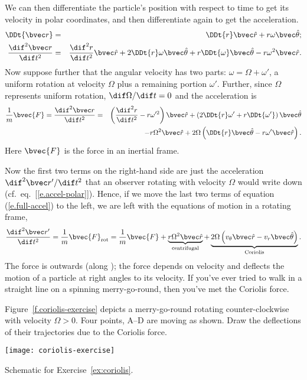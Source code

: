 We can then differentiate the particle's position with respect to time to get its velocity in polar coordinates, and then differentiate again to get the acceleration.
\begin{eqnarray}
\DDt{\rv} &=& \DDt{r}\rhat + r\omega\thetahat; \\
\DDtt{\rv} &=& \DDtt{r}\rhat + 2\DDt{r}\omega\thetahat + r \DDt{\omega}\thetahat - r\omega^{2}\rhat.
\label{e.accel-polar}
\end{eqnarray}
Now suppose further that the angular velocity has two parts: $\omega = \Omega+\omega'$, a uniform rotation at velocity $\Omega$ plus a remaining portion $\omega'$.  Further, since $\Omega$ represents uniform rotation, $\dif\Omega/\dif t = 0$ and the acceleration is
\begin{eqnarray}
\frac{1}{m}\bvec{F} = \DDtt{\rv} &=& \left(\DDtt{r} - r\omega'^{2}\right)\rhat + \left(2\DDt{r}\omega' + r\DDt{\omega'}\right)\thetahat\nonumber\\
 && -r\Omega^{2}\rhat + 2\Omega\left(\DDt{r}\thetahat - r\omega'\rhat\right).
\label{e.full-accel}
\end{eqnarray}
Here $\bvec{F}$ is the force in an inertial frame.

Now the first two terms on the right-hand side are just the acceleration $\dif^{2}\rv'/\dif t^{2}$ that an observer rotating with velocity $\Omega$ would write down (cf.\ eq.~[\ref{e.accel-polar}]).  Hence, if we move the last two terms of equation (\ref{e.full-accel}) to the left, we are left with the equations of motion in a rotating frame,
\begin{equation}\label{e.motion-rotating}
\DDtt{\rv'} = \frac{1}{m}\bvec{F}_{\mathrm{rot}} = \frac{1}{m}\bvec{F} 
	+  \underbrace{r\Omega^{2}\rhat}_{\textrm{centrifugal}}
	+	\underbrace{2\Omega\left(v_{\theta}\rhat - v_{r}\thetahat \right)}_{\textrm{Coriolis}}.
\end{equation}
The  force is outwards (along \rhat); the  force depends on velocity and deflects the motion of a particle at right angles to its velocity.  If you've ever tried to walk in a straight line on a spinning merry-go-round, then you've met the Coriolis force.

\begin{exercisebox}
\label{ex:coriolis}
Figure~\ref{f.coriolis-exercise} depicts a merry-go-round rotating counter-clockwise with velocity $\Omega > 0$.  Four points, A--D are moving as shown.  Draw the deflections of their trajectories due to the Coriolis force.
\end{exercisebox}
\begin{marginfigure}[4\baselineskip]
\texttt{[image: coriolis-exercise]}
\caption[Movement on a merry-go-round]{Schematic for Exercise~\ref{ex:coriolis}.
\label{f.coriolis-exercise}}
\end{marginfigure}

